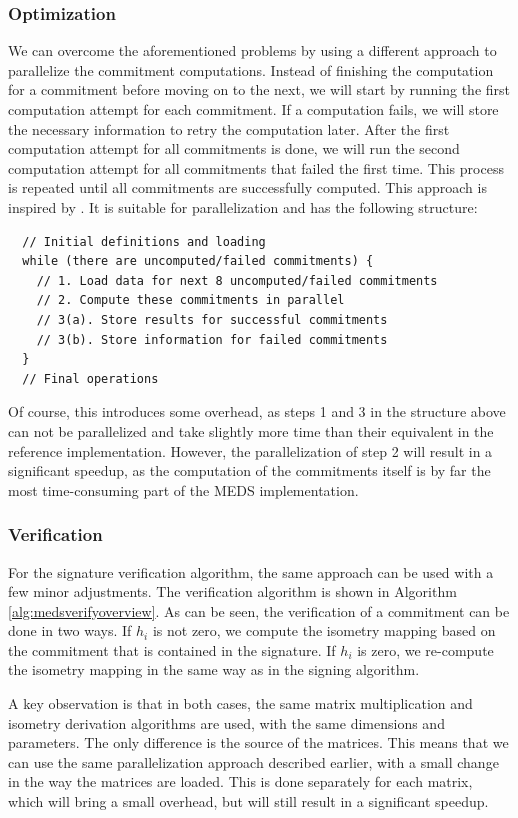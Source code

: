 \documentclass[11pt,a4paper]{report}
\theoremstyle{definition}
\begin{document}
\subsubsection{Optimization}
\label{sec:commitmentparallelizationoptimization}
We can overcome the aforementioned problems by using a different approach to parallelize the commitment computations. Instead of finishing the computation for a commitment before moving on to the next, we will start by running the first computation attempt for each commitment. If a computation fails, we will store the necessary information to retry the computation later. After the first computation attempt for all commitments is done, we will run the second computation attempt for all commitments that failed the first time. This process is repeated until all commitments are successfully computed. This approach is inspired by \cite{IIS2023HighLevel}. It is suitable for parallelization and has the following structure:
\begin{verbatim}
  // Initial definitions and loading
  while (there are uncomputed/failed commitments) {
    // 1. Load data for next 8 uncomputed/failed commitments
    // 2. Compute these commitments in parallel
    // 3(a). Store results for successful commitments
    // 3(b). Store information for failed commitments
  }
  // Final operations
\end{verbatim}
Of course, this introduces some overhead, as steps 1 and 3 in the structure above can not be parallelized and take slightly more time than their equivalent in the reference implementation. However, the parallelization of step 2 will result in a significant speedup, as the computation of the commitments itself is by far the most time-consuming part of the MEDS implementation.

\subsubsection{Verification}
For the signature verification algorithm, the same approach can be used with a few minor adjustments. The verification algorithm is shown in Algorithm \ref{alg:medsverifyoverview}. As can be seen, the verification of a commitment can be done in two ways. If $h_i$ is not zero, we compute the isometry mapping based on the commitment that is contained in the signature. If $h_i$ is zero, we re-compute the isometry mapping in the same way as in the signing algorithm.

A key observation is that in both cases, the same matrix multiplication and isometry derivation algorithms are used, with the same dimensions and parameters. The only difference is the source of the matrices. This means that we can use the same parallelization approach described earlier, with a small change in the way the matrices are loaded. This is done separately for each matrix, which will bring a small overhead, but will still result in a significant speedup.
\end{document}
